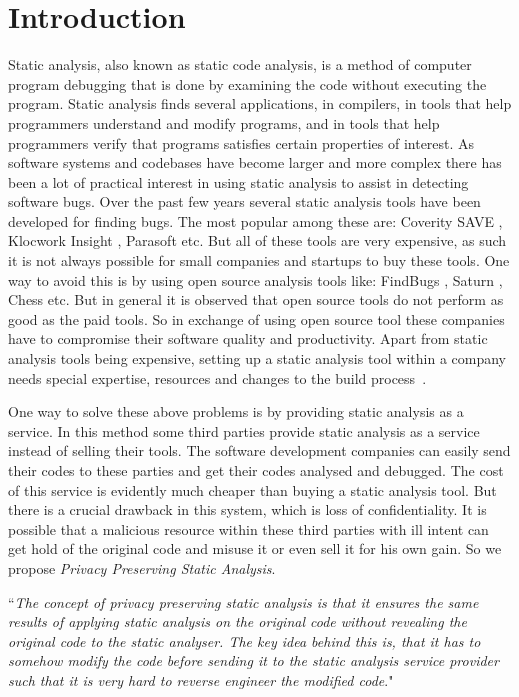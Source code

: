 \documentclass[twocolumn]{article}
\begin{document}
\section{Introduction}
Static analysis, also known as static code analysis, is a method of computer program debugging that is done by examining the code without executing the program. Static analysis finds 
several applications, in compilers, in tools that help programmers understand and modify programs, and in tools that help programmers verify that programs satisfies certain 
properties of interest. As software systems and codebases have become larger and more complex there has been a lot of practical interest in using static analysis to assist in 
detecting software bugs. Over the past few years several static analysis tools have been developed for finding bugs. The most popular among these are: Coverity SAVE \cite{coverity},
Klocwork Insight \cite{klocwork}, Parasoft \cite{parasoft} etc. But all of these tools are very expensive, as such it is not always possible for small companies and startups to buy
these tools. One way to avoid this is by using open source analysis tools like: FindBugs \cite{findbugs}, Saturn \cite{saturn}, Chess \cite{chess} etc. But in general it is observed
that open source tools do not perform as good as the paid tools. So in exchange of using open source tool these companies have to compromise their software quality and productivity. 
Apart from static analysis tools being expensive, setting up a static analysis tool within a company needs special expertise, resources and changes to the build process~\cite{fse13,
billionlinesofcode}.
 
One way to solve these above problems is by providing static analysis as a service. In this method some third parties provide static analysis as a service instead of selling their tools.
The software development companies can easily send their codes to these parties and get their codes analysed and debugged. The cost of this service is evidently much cheaper than 
buying a static analysis tool. But there is a crucial drawback in this system, which is loss of confidentiality. It is possible that a malicious resource within these third parties with 
ill intent can get hold of the original code and misuse it or even sell it for his own gain. So we propose {\em Privacy Preserving Static Analysis}. 

``{\em The concept of privacy preserving static analysis is that it ensures the same results of applying static analysis on the original code without revealing the original code to 
the static analyser. The key idea behind this is, that it has to somehow modify the code before sending it to the static analysis service provider such that it is very hard to reverse 
engineer the modified code}."
\end{document}
